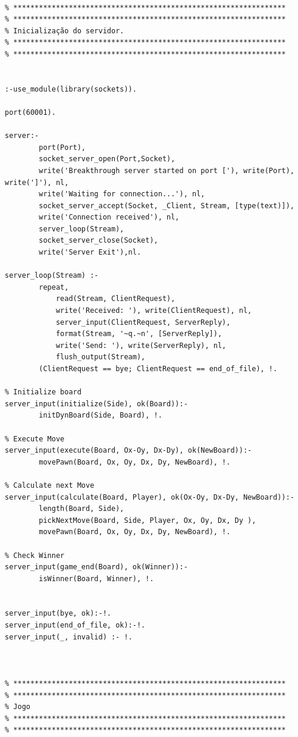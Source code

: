 \documentclass[15pt,a4paper]{article}
\begin{document}

\begin{lstlisting}

% ****************************************************************
% ****************************************************************
% Inicialização do servidor.
% ****************************************************************
% ****************************************************************


:-use_module(library(sockets)).

port(60001).

server:-
		port(Port),
		socket_server_open(Port,Socket),
		write('Breakthrough server started on port ['), write(Port), write(']'), nl,
		write('Waiting for connection...'), nl,
		socket_server_accept(Socket, _Client, Stream, [type(text)]),
		write('Connection received'), nl,
		server_loop(Stream),
		socket_server_close(Socket),
		write('Server Exit'),nl.

server_loop(Stream) :-
		repeat,
			read(Stream, ClientRequest),
			write('Received: '), write(ClientRequest), nl, 
			server_input(ClientRequest, ServerReply),
			format(Stream, '~q.~n', [ServerReply]),
			write('Send: '), write(ServerReply), nl, 
			flush_output(Stream),
		(ClientRequest == bye; ClientRequest == end_of_file), !.

% Initialize board
server_input(initialize(Side), ok(Board)):- 
		initDynBoard(Side, Board), !.

% Execute Move	
server_input(execute(Board, Ox-Oy, Dx-Dy), ok(NewBoard)):- 
		movePawn(Board, Ox, Oy, Dx, Dy, NewBoard), !.

% Calculate next Move
server_input(calculate(Board, Player), ok(Ox-Oy, Dx-Dy, NewBoard)):- 
		length(Board, Side),
		pickNextMove(Board, Side, Player, Ox, Oy, Dx, Dy ),
		movePawn(Board, Ox, Oy, Dx, Dy, NewBoard), !.
	
% Check Winner
server_input(game_end(Board), ok(Winner)):- 
		isWinner(Board, Winner), !.
	
	
server_input(bye, ok):-!.
server_input(end_of_file, ok):-!.
server_input(_, invalid) :- !.



% ****************************************************************
% ****************************************************************
% Jogo
% ****************************************************************
% ****************************************************************


\end{lstlisting}
\end{document}
